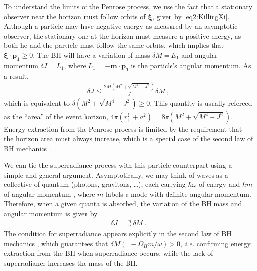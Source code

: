 To understand the limits of the Penrose process, we use the fact that a stationary observer near the horizon must follow orbits of $\bm{\xi}$, given by \eqref{eq2:KillingXi}. 
Although a particle may have negative energy as measured by an asymptotic observer, the stationary one at the horizon must measure a positive energy, as both he and the particle must follow the same orbits, which implies that $\bm{\xi} \cdot \bm{p_1} \ge 0$.
The BH will have a variation of mass $\delta M =E_1$ and angular momentum $\delta J = L_1$, where $L_1 = - \bm{m} \cdot \bm{p_1}$ is the particle's angular momentum. As a result,
\begin{align}
    \label{eq2:penroseCondition}
    \delta J \le \frac{2M\left(M^2+\sqrt{M^4-J^2}\right)}{J} \delta M ~,
\end{align}
which is equivalent to $\delta \left(M^2+\sqrt{M^4-J^2}\right) \ge 0$. This quantity is usually refereed as the ``area'' of the event horizon, $4\pi(r_+^2+a^2)=8\pi\left(M^2+\sqrt{M^4-J^2}\right)$.
Energy extraction from the Penrose process is limited by the requirement that the horizon area must always increase, which is a special case of the second law of BH mechanics \cite{Hawking1973}. 

We can tie the superradiance process with this particle counterpart using a simple and general argument.
Asymptotically, we may think of waves as a collective of quantum (photons, gravitons, \dots), each carrying $\hbar \omega$ of energy and $\hbar m$ of angular momentum \cite{Bekenstein1973}, where $m$ labels a mode with definite angular momentum.
Therefore, when a given quanta is absorbed, the variation of the BH mass and angular momentum is given by
\begin{align}
    \label{eq2:spinMassRatio}
    \delta J = \frac{m}{\omega} \,\delta M ~.
\end{align}
The condition for superradiance  appears explicitly in the second law of BH mechanics , which guarantees that $\delta M (1 - \Omega_H m /\omega)>0$, \emph{i.e.} confirming energy extraction from the BH when superradiance occurs, while the lack of superradiance increases the mass of the BH.


\cleardoublepage